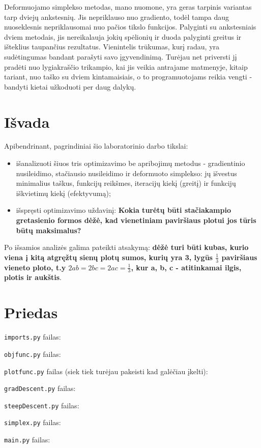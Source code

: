 \documentclass{article}
\begin{document}
Deformuojamo simplekso metodas, mano nuomone, yra geras tarpinis variantas tarp dviejų ankstesnių. Jis nepriklauso nuo gradiento, todėl tampa daug nuoseklesnis nepriklausomai nuo pačios tikslo funkcijos. Palyginti su ankstesniais dviem metodais, jis nereikalauja jokių spėlionių ir duoda palyginti greitus ir išteklius taupančius rezultatus. Vienintelis trūkumas, kurį radau, yra sudėtingumas bandant parašyti savo įgyvendinimą. Turėjau net priversti jį pradėti nuo lygiakraščio trikampio, kai jis veikia antrajame matmenyje, kitaip tariant, nuo taško su dviem kintamaisiais, o to programuotojams reikia vengti - bandyti kietai užkoduoti per daug dalykų.
\section{Išvada}
Apibendrinant, pagrindiniai šio laboratorinio darbo tikslai:

\begin{itemize}
    \item išanalizuoti šiuos tris optimizavimo be apribojimų metodus - gradientinio nusileidimo, stačiausio nusileidimo ir deformuoto simplekso: jų išvestus minimalius taškus, funkcijų reikšmes, iteracijų kiekį (greitį) ir funkcijų iškvietimų kiekį (efektyvumą); 
    \item išspręsti optimizavimo uždavinį: \textbf{Kokia turėtų būti stačiakampio gretasienio formos dėžė, kad vienetiniam paviršiaus plotui jos tūris būtų maksimalus?}
\end{itemize}

Po išsamios analizės galima pateikti atsakymą: \textbf{dėžė turi būti kubas, kurio viena į kitą atgręžtų sienų plotų sumos, kurių yra 3, lygūs $\frac{1}{3}$ paviršiaus vieneto ploto, t.y $2ab = 2bc = 2ac = \frac{1}{3}$, kur a, b, c - atitinkamai ilgis, plotis ir aukštis}.
\section{Priedas}
\lstinline|imports.py| failas:

\lstinline|objfunc.py| failas:

\lstinline|plotfunc.py| failas (siek tiek turėjau pakeisti kad galėčiau įkelti):

\lstinline|gradDescent.py| failas:

\lstinline|steepDescent.py| failas:

\lstinline|simplex.py| failas:

\lstinline|main.py| failas:
\end{document}
